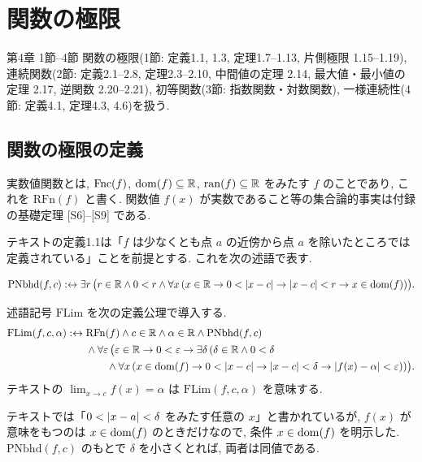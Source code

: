 \chapter{関数の極限}\label{ch:text4}

\begin{textref}{第4章 1節--4節}
  関数の極限(1節: 定義1.1, 1.3, 定理1.7--1.13, 片側極限 1.15--1.19), 連続関数(2節: 定義2.1--2.8, 定理2.3--2.10, 中間値の定理 2.14, 最大値・最小値の定理 2.17, 逆関数 2.20--2.21), 初等関数(3節: 指数関数・対数関数), 一様連続性(4節: 定義4.1, 定理4.3, 4.6)を扱う.
\end{textref}

\section{関数の極限の定義}

実数値関数とは, $\mathrm{Fnc}(f)$, $\mathrm{dom}(f) \subseteq \mathbb{R}$, $\mathrm{ran}(f) \subseteq \mathbb{R}$ をみたす $f$ のことであり, これを $\mathrm{RFn}(f)$ と書く. 関数値 $f(x)$ が実数であること等の集合論的事実は付録の基礎定理 [S6]--[S9] である.

テキストの定義1.1は「$f$ は少なくとも点 $a$ の近傍から点 $a$ を除いたところでは定義されている」ことを前提とする. これを次の述語で表す.

\begin{dfn}
  \[ \mathrm{PNbhd}(f, c) :\leftrightarrow \exists r\,\bigl(r \in \mathbb{R} \land 0 < r \land \forall x\,(x \in \mathbb{R} \to 0 < \lvert x - c\rvert \to \lvert x - c\rvert < r \to x \in \mathrm{dom}(f))\bigr). \]
\end{dfn}

\begin{dfn}[テキスト定義1.1]\label{dfn:flim}
  述語記号 $\mathrm{FLim}$ を次の定義公理で導入する.
  \begin{align*}
    \mathrm{FLim}(f, c, \alpha) :\leftrightarrow{}& \mathrm{RFn}(f) \land c \in \mathbb{R} \land \alpha \in \mathbb{R} \land \mathrm{PNbhd}(f, c) \\
    & \land \forall \varepsilon\,\bigl(\varepsilon \in \mathbb{R} \to 0 < \varepsilon \to \exists\delta\,(\delta \in \mathbb{R} \land 0 < \delta \\
    & \qquad \land \forall x\,(x \in \mathrm{dom}(f) \to 0 < \lvert x - c\rvert \to \lvert x - c\rvert < \delta \to \lvert f(x) - \alpha\rvert < \varepsilon))\bigr).
  \end{align*}
  テキストの $\lim_{x \to c} f(x) = \alpha$ は $\mathrm{FLim}(f, c, \alpha)$ を意味する.
\end{dfn}

テキストでは「$0 < \lvert x - a\rvert < \delta$ をみたす任意の $x$」と書かれているが, $f(x)$ が意味をもつのは $x \in \mathrm{dom}(f)$ のときだけなので, 条件 $x \in \mathrm{dom}(f)$ を明示した. $\mathrm{PNbhd}(f, c)$ のもとで $\delta$ を小さくとれば, 両者は同値である.

